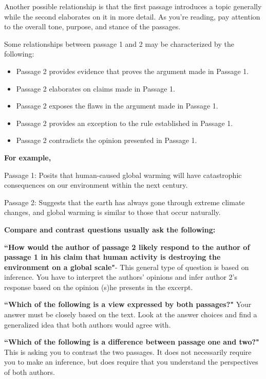 \documentclass[12pt]{book}
\renewcommand{\indent}{\hspace{1cm}}
\begin{document}
\bigskip
Another possible relationship is that the first passage introduces a topic generally while the second elaborates on it in more detail.  As you're reading, pay attention to the overall tone, purpose, and stance of the passages.

\bigskip
Some relationships between passage 1 and 2 may be characterized by the following:

\begin{itemize}
\item Passage 2 provides evidence that proves the argument made in Passage 1.
\item Passage 2 elaborates on claims made in Passage 1.
\item Passage 2 exposes the flaws in the argument made in Passage 1.
\item Passage 2 provides an exception to the rule established in Passage 1.
\item Passage 2 contradicts the opinion presented in Passage 1.
\end{itemize}

\bigskip
\textbf{For example, }

Passage 1: Posits that human-caused global warming will have catastrophic consequences on our environment within the next century.

Passage 2: Suggests that the earth has always gone through extreme climate changes, and global warming is similar to those that occur naturally.

\newpage
\textbf{Compare and contrast questions usually ask the following:}

\bigskip
\indent \textbf{``How would the author of passage 2 likely respond to the author of passage 1 in his claim that human activity is destroying the environment on a global scale"}- This general type of question is based on inference.  You have to interpret the authors' opinions and infer author 2's response based on the opinion (s)he presents in the excerpt.
    
\bigskip
\indent \textbf{``Which of the following is a view expressed by both passages?"}   Your answer must be closely based on the text.  Look at the answer choices and find a generalized idea that both authors would agree with.

\bigskip
\indent \textbf{``Which of the following is a difference between passage one and two?"} This is asking you to contrast the two passages.  It does not necessarily require you to make an inference, but does require that you understand the perspectives of both authors.
\end{document}
